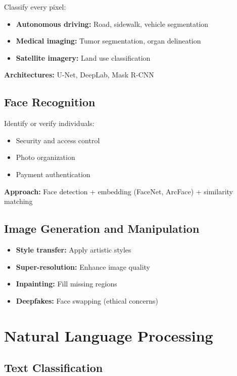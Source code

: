 Classify every pixel:
\begin{itemize}
    \item \textbf{Autonomous driving:} Road, sidewalk, vehicle segmentation
    \item \textbf{Medical imaging:} Tumor segmentation, organ delineation
    \item \textbf{Satellite imagery:} Land use classification
\end{itemize}

\textbf{Architectures:} U-Net, DeepLab, Mask R-CNN

\subsection{Face Recognition}

Identify or verify individuals:
\begin{itemize}
    \item Security and access control
    \item Photo organization
    \item Payment authentication
\end{itemize}

\textbf{Approach:} Face detection + embedding (FaceNet, ArcFace) + similarity matching

\subsection{Image Generation and Manipulation}

\begin{itemize}
    \item \textbf{Style transfer:} Apply artistic styles
    \item \textbf{Super-resolution:} Enhance image quality
    \item \textbf{Inpainting:} Fill missing regions
    \item \textbf{Deepfakes:} Face swapping (ethical concerns)
\end{itemize}

\section{Natural Language Processing}
\label{sec:nlp-applications}

\subsection{Text Classification}

